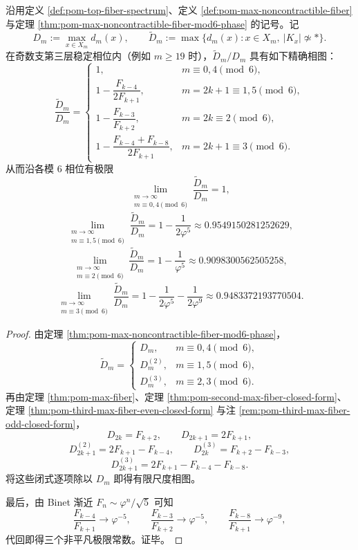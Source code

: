 \begin{theorem}\label{thm:derived-max-noncontractible-fiber-defect-constants}
沿用定义 \ref{def:pom-top-fiber-spectrum}、定义 \ref{def:pom-max-noncontractible-fiber} 与定理 \ref{thm:pom-max-noncontractible-fiber-mod6-phase} 的记号。记
\[
D_m:=\max_{x\in X_m}d_m(x),
\qquad
\widetilde D_m:=\max\{d_m(x):x\in X_m,\ |K_x|\not\simeq \ast\}.
\]
在奇数支第三层稳定相位内（例如 \(m\ge 19\) 时），\(\widetilde D_m/D_m\) 具有如下精确相图：
\[
\frac{\widetilde D_m}{D_m}=
\begin{cases}
1, & m\equiv 0,4\pmod 6,\\[8pt]
1-\dfrac{F_{k-4}}{2F_{k+1}}, & m=2k+1\equiv 1,5\pmod 6,\\[12pt]
1-\dfrac{F_{k-3}}{F_{k+2}}, & m=2k\equiv 2\pmod 6,\\[12pt]
1-\dfrac{F_{k-4}+F_{k-8}}{2F_{k+1}}, & m=2k+1\equiv 3\pmod 6.
\end{cases}
\]
从而沿各模 \(6\) 相位有极限
\[
\lim_{\substack{m\to\infty\\ m\equiv 0,4\!\!\!\!\pmod 6}}
\frac{\widetilde D_m}{D_m}
=1,
\]
\[
\lim_{\substack{m\to\infty\\ m\equiv 1,5\!\!\!\!\pmod 6}}
\frac{\widetilde D_m}{D_m}
=1-\frac{1}{2\varphi^{5}}
\approx 0.9549150281252629,
\]
\[
\lim_{\substack{m\to\infty\\ m\equiv 2\!\!\!\!\pmod 6}}
\frac{\widetilde D_m}{D_m}
=1-\frac{1}{\varphi^{5}}
\approx 0.9098300562505258,
\]
\[
\lim_{\substack{m\to\infty\\ m\equiv 3\!\!\!\!\pmod 6}}
\frac{\widetilde D_m}{D_m}
=1-\frac{1}{2\varphi^{5}}-\frac{1}{2\varphi^{9}}
\approx 0.9483372193770504.
\]
\end{theorem}
\begin{proof}
由定理 \ref{thm:pom-max-noncontractible-fiber-mod6-phase}，
\[
\widetilde D_m=
\begin{cases}
D_m, & m\equiv 0,4\pmod 6,\\[2pt]
D_m^{(2)}, & m\equiv 1,5\pmod 6,\\[2pt]
D_m^{(3)}, & m\equiv 2,3\pmod 6.
\end{cases}
\]
再由定理 \ref{thm:pom-max-fiber}、定理 \ref{thm:pom-second-max-fiber-closed-form}、定理 \ref{thm:pom-third-max-fiber-even-closed-form} 与注 \ref{rem:pom-third-max-fiber-odd-closed-form}，
\[
D_{2k}=F_{k+2},\qquad D_{2k+1}=2F_{k+1},
\]
\[
D_{2k+1}^{(2)}=2F_{k+1}-F_{k-4},
\qquad
D_{2k}^{(3)}=F_{k+2}-F_{k-3},
\]
\[
D_{2k+1}^{(3)}=2F_{k+1}-F_{k-4}-F_{k-8}.
\]
将这些闭式逐项除以 \(D_m\) 即得有限尺度相图。

最后，由 Binet 渐近 \(F_n\sim \varphi^n/\sqrt5\) 可知
\[
\frac{F_{k-4}}{F_{k+1}}\to \varphi^{-5},
\qquad
\frac{F_{k-3}}{F_{k+2}}\to \varphi^{-5},
\qquad
\frac{F_{k-8}}{F_{k+1}}\to \varphi^{-9},
\]
代回即得三个非平凡极限常数。证毕。
\end{proof}

